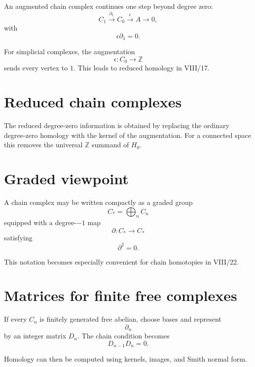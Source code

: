 An augmented chain complex continues one step beyond degree zero:
\[
C_1\xrightarrow{\partial_1}C_0
\xrightarrow{\epsilon}A\to0,
\]
with
\[
\epsilon\partial_1=0.
\]

For simplicial complexes, the augmentation
\[
\epsilon:C_0\to\mathbb Z
\]
sends every vertex to \(1\).  This leads to reduced homology in VIII/17.

\section{Reduced chain complexes}

The reduced degree-zero information is obtained by replacing the ordinary
degree-zero homology with the kernel of the augmentation.  For a connected
space this removes the universal \(\mathbb Z\) summand of \(H_0\).

\section{Graded viewpoint}

A chain complex may be written compactly as a graded group
\[
C_*=\bigoplus_n C_n
\]
equipped with a degree-\(-1\) map
\[
\partial:C_*\to C_*
\]
satisfying
\[
\partial^2=0.
\]

This notation becomes especially convenient for chain homotopies in VIII/22.

\section{Matrices for finite free complexes}

If every \(C_n\) is finitely generated free abelian, choose bases and represent
\[
\partial_n
\]
by an integer matrix \(D_n\).  The chain condition becomes
\[
D_{n-1}D_n=0.
\]

Homology can then be computed using kernels, images, and Smith normal form.

